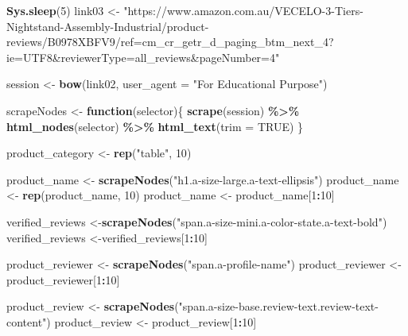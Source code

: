 \documentclass[
]{article}
\newenvironment{Shaded}{\begin{snugshade}}{\end{snugshade}}
\newcommand{\AttributeTok}[1]{\textcolor[rgb]{0.13,0.29,0.53}{#1}}
\newcommand{\ConstantTok}[1]{\textcolor[rgb]{0.56,0.35,0.01}{#1}}
\newcommand{\ControlFlowTok}[1]{\textcolor[rgb]{0.13,0.29,0.53}{\textbf{#1}}}
\newcommand{\DecValTok}[1]{\textcolor[rgb]{0.00,0.00,0.81}{#1}}
\newcommand{\FunctionTok}[1]{\textcolor[rgb]{0.13,0.29,0.53}{\textbf{#1}}}
\newcommand{\NormalTok}[1]{#1}
\newcommand{\OtherTok}[1]{\textcolor[rgb]{0.56,0.35,0.01}{#1}}
\newcommand{\SpecialCharTok}[1]{\textcolor[rgb]{0.81,0.36,0.00}{\textbf{#1}}}
\newcommand{\StringTok}[1]{\textcolor[rgb]{0.31,0.60,0.02}{#1}}
\begin{document}
\begin{Shaded}
\begin{Highlighting}[]
   \FunctionTok{Sys.sleep}\NormalTok{(}\DecValTok{5}\NormalTok{)}
\NormalTok{link03 }\OtherTok{\textless{}{-}} \StringTok{"https://www.amazon.com.au/VECELO{-}3{-}Tiers{-}Nightstand{-}Assembly{-}Industrial/product{-}reviews/B0978XBFV9/ref=cm\_cr\_getr\_d\_paging\_btm\_next\_4?ie=UTF8\&reviewerType=all\_reviews\&pageNumber=4"}


\NormalTok{  session }\OtherTok{\textless{}{-}} \FunctionTok{bow}\NormalTok{(link02,}
               \AttributeTok{user\_agent =} \StringTok{"For Educational Purpose"}\NormalTok{)}

\NormalTok{  scrapeNodes }\OtherTok{\textless{}{-}} \ControlFlowTok{function}\NormalTok{(selector)\{}
    \FunctionTok{scrape}\NormalTok{(session) }\SpecialCharTok{\%\textgreater{}\%}
      \FunctionTok{html\_nodes}\NormalTok{(selector) }\SpecialCharTok{\%\textgreater{}\%}
      \FunctionTok{html\_text}\NormalTok{(}\AttributeTok{trim =} \ConstantTok{TRUE}\NormalTok{)}
\NormalTok{  \}}

\NormalTok{  product\_category }\OtherTok{\textless{}{-}} \FunctionTok{rep}\NormalTok{(}\StringTok{"table"}\NormalTok{, }\DecValTok{10}\NormalTok{)}

\NormalTok{  product\_name }\OtherTok{\textless{}{-}} \FunctionTok{scrapeNodes}\NormalTok{(}\StringTok{"h1.a{-}size{-}large.a{-}text{-}ellipsis"}\NormalTok{)}
\NormalTok{  product\_name }\OtherTok{\textless{}{-}} \FunctionTok{rep}\NormalTok{(product\_name, }\DecValTok{10}\NormalTok{)}
\NormalTok{  product\_name }\OtherTok{\textless{}{-}}\NormalTok{ product\_name[}\DecValTok{1}\SpecialCharTok{:}\DecValTok{10}\NormalTok{]}
  
\NormalTok{  verified\_reviews }\OtherTok{\textless{}{-}}\FunctionTok{scrapeNodes}\NormalTok{(}\StringTok{"span.a{-}size{-}mini.a{-}color{-}state.a{-}text{-}bold"}\NormalTok{)}
\NormalTok{  verified\_reviews }\OtherTok{\textless{}{-}}\NormalTok{verified\_reviews[}\DecValTok{1}\SpecialCharTok{:}\DecValTok{10}\NormalTok{]}
  
\NormalTok{  product\_reviewer }\OtherTok{\textless{}{-}} \FunctionTok{scrapeNodes}\NormalTok{(}\StringTok{"span.a{-}profile{-}name"}\NormalTok{)}
\NormalTok{  product\_reviewer }\OtherTok{\textless{}{-}}\NormalTok{ product\_reviewer[}\DecValTok{1}\SpecialCharTok{:}\DecValTok{10}\NormalTok{]}
  
\NormalTok{  product\_review }\OtherTok{\textless{}{-}} \FunctionTok{scrapeNodes}\NormalTok{(}\StringTok{"span.a{-}size{-}base.review{-}text.review{-}text{-}content"}\NormalTok{)}
\NormalTok{  product\_review }\OtherTok{\textless{}{-}}\NormalTok{ product\_review[}\DecValTok{1}\SpecialCharTok{:}\DecValTok{10}\NormalTok{]}
  

\end{Highlighting}
\end{Shaded}
\end{document}
